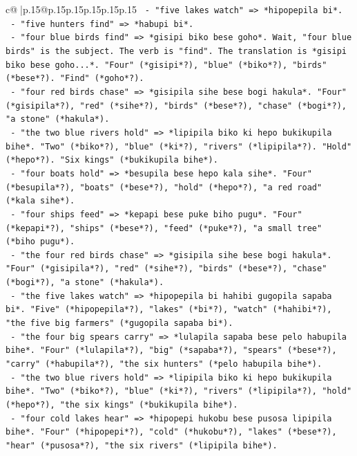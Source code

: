 \documentclass{article}
\begin{document}
{\begin{supertabular}{c@{$\;$}|p{.15\linewidth}@{}p{.15\linewidth}p{.15\linewidth}p{.15\linewidth}p{.15\linewidth}p{.15\linewidth}}
{{{\texttt{         {-} "five lakes watch" => *hipopepila bi*.} \\
\texttt{         {-} "five hunters find" => *habupi bi*.} \\
\texttt{         {-} "four blue birds find" => *gisipi biko bese goho*. Wait, "four blue birds" is the subject. The verb is "find". The translation is *gisipi biko bese goho...*. "Four" (*gisipi*?), "blue" (*biko*?), "birds" (*bese*?). "Find" (*goho*?).} \\
\texttt{         {-} "four red birds chase" => *gisipila sihe bese bogi hakula*. "Four" (*gisipila*?), "red" (*sihe*?), "birds" (*bese*?), "chase" (*bogi*?), "a stone" (*hakula*).} \\
\texttt{         {-} "the two blue rivers hold" => *lipipila biko ki hepo bukikupila bihe*. "Two" (*biko*?), "blue" (*ki*?), "rivers" (*lipipila*?). "Hold" (*hepo*?). "Six kings" (*bukikupila bihe*).} \\
\texttt{         {-} "four boats hold" => *besupila bese hepo kala sihe*. "Four" (*besupila*?), "boats" (*bese*?), "hold" (*hepo*?), "a red road" (*kala sihe*).} \\
\texttt{         {-} "four ships feed" => *kepapi bese puke biho pugu*. "Four" (*kepapi*?), "ships" (*bese*?), "feed" (*puke*?), "a small tree" (*biho pugu*).} \\
\texttt{         {-} "the four red birds chase" => *gisipila sihe bese bogi hakula*. "Four" (*gisipila*?), "red" (*sihe*?), "birds" (*bese*?), "chase" (*bogi*?), "a stone" (*hakula*).} \\
\texttt{         {-} "the five lakes watch" => *hipopepila bi hahibi gugopila sapaba bi*. "Five" (*hipopepila*?), "lakes" (*bi*?), "watch" (*hahibi*?), "the five big farmers" (*gugopila sapaba bi*).} \\
\texttt{         {-} "the four big spears carry" => *lulapila sapaba bese pelo habupila bihe*. "Four" (*lulapila*?), "big" (*sapaba*?), "spears" (*bese*?), "carry" (*habupila*?), "the six hunters" (*pelo habupila bihe*).} \\
\texttt{         {-} "the two blue rivers hold" => *lipipila biko ki hepo bukikupila bihe*. "Two" (*biko*?), "blue" (*ki*?), "rivers" (*lipipila*?), "hold" (*hepo*?), "the six kings" (*bukikupila bihe*).} \\
\texttt{         {-} "four cold lakes hear" => *hipopepi hukobu bese pusosa lipipila bihe*. "Four" (*hipopepi*?), "cold" (*hukobu*?), "lakes" (*bese*?), "hear" (*pusosa*?), "the six rivers" (*lipipila bihe*).} \\
}}}
\end{supertabular}}
\end{document}
